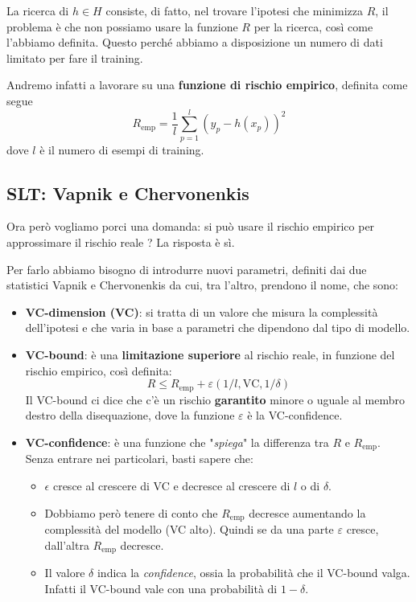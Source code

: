 La ricerca di $h \in H$ consiste, di fatto, nel trovare l'ipotesi che minimizza $R$, il problema \`e che non possiamo
usare la funzione $R$ per la ricerca, cos\`i come l'abbiamo definita. Questo perch\'e abbiamo a disposizione un numero
di dati limitato per fare il training.

Andremo infatti a lavorare su una \textbf{funzione di rischio empirico}, definita come segue
\[ R_{\text{emp}} = \frac{1}{l} \sum_{p=1}^l (y_p - h(x_p))^2 \]
dove $l$ \`e il numero di esempi di training.

\subsection{SLT: Vapnik e Chervonenkis}
Ora per\`o vogliamo porci una domanda: si pu\`o usare il rischio empirico per approssimare il rischio reale ? La risposta
\`e s\`i.

Per farlo abbiamo bisogno di introdurre nuovi parametri, definiti dai due statistici Vapnik e Chervonenkis da cui, tra
l'altro, prendono il nome, che sono:
\begin{itemize}
	\item \textbf{VC-dimension (VC)}: si tratta di un valore che misura la complessit\`a dell'ipotesi e che varia in base a
	      parametri che dipendono dal tipo di modello.
	\item \textbf{VC-bound}: \`e una \textbf{limitazione superiore} al rischio reale, in funzione del rischio empirico,
	      cos\`i definita:
	      \[ R \leq R_{\text{emp}} + \varepsilon (1 / l, \text{VC}, 1 / \delta) \]
	      Il VC-bound ci dice che c'\`e un rischio \textbf{garantito} minore o uguale al membro destro della disequazione,
	      dove la funzione $\varepsilon$ \`e la VC-confidence.
	\item \textbf{VC-confidence}: \`e una funzione che "\emph{spiega}" la differenza tra $R$ e $R_\text{emp}$.
	      Senza entrare nei particolari, basti sapere che:
	      \begin{itemize}
		      \item $\epsilon$ cresce al crescere di VC e decresce al crescere di $l$ o di $\delta$.
		      \item Dobbiamo per\`o tenere di conto che $R_\text{emp}$ decresce aumentando la complessit\`a del modello
		            (VC alto). Quindi se da una parte $\varepsilon$ cresce, dall'altra $R_\text{emp}$ decresce.
		      \item Il valore $\delta$ indica la \emph{confidence}, ossia la probabilit\`a che il VC-bound valga. Infatti
		            il VC-bound vale con una probabilit\`a di $1 - \delta$.
	      \end{itemize}
\end{itemize}

